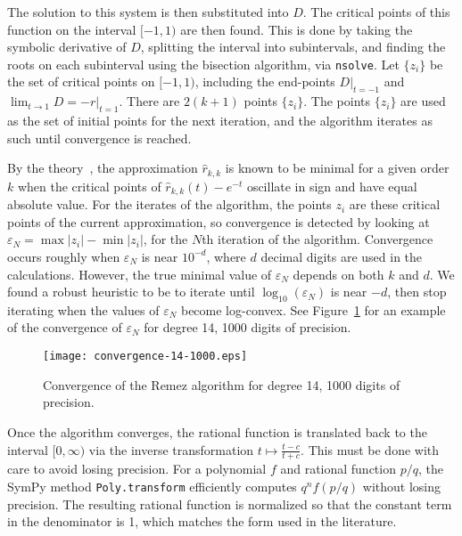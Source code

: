 The solution to this system is then substituted into $D$. The critical points
of this function on the interval $[-1, 1)$ are then found. This is done by
taking the symbolic derivative of $D$, splitting the interval into
subintervals, and finding the roots on each subinterval using the bisection
algorithm, via \texttt{nsolve}. Let $\{z_i\}$ be the set of critical points on
$[-1, 1)$, including the end-points $D|_{t=-1}$ and
$\lim_{t\to 1} D=-r|_{t=1}$. There are $2(k+1)$ points $\{z_i\}$. The points
$\{z_i\}$ are used as the set of initial points for the next iteration, and
the algorithm iterates as such until convergence is reached.

By the theory~\cite{ationneeded}, the approximation $\hat{r}_{k, k}$ is known
to be minimal for a given order $k$ when the critical points of
$\hat{r}_{k, k}(t) - e^{-t}$ oscillate in sign and have equal absolute value.
For the iterates of the algorithm, the points $z_i$ are these critical points
of the current approximation, so convergence is detected by looking at
$\varepsilon_N = \max{|z_i|} - \min{|z_i|}$, for the $N$th iteration of the
algorithm. Convergence occurs roughly when $\varepsilon_N$ is near $10^{-d}$,
where $d$ decimal digits are used in the calculations. However, the true
minimal value of $\varepsilon_N$ depends on both $k$ and $d$. We found a
robust heuristic to be to iterate until $\log_{10}{(\varepsilon_N)}$ is near
$-d$, then stop iterating when the values of $\varepsilon_N$ become
log-convex. See Figure~\ref{fig:convergence-14-1000} for an example of the
convergence of $\varepsilon_N$ for degree 14, 1000 digits of precision.

\begin{figure}[!ht]
\centering
\texttt{[image: convergence-14-1000.eps]}
\caption{Convergence of the Remez algorithm for degree 14, 1000 digits of
  precision.}
\label{fig:convergence-14-1000}
\end{figure}

Once the algorithm converges, the rational function is translated back to the
interval $[0, \infty)$ via the inverse transformation $t\mapsto \frac{t - c}{t
  + c}$. This must be done with care to avoid losing precision. For a
polynomial $f$ and rational function $p/q$, the SymPy
method \texttt{Poly.transform} efficiently computes
$q^nf\left(p/q\right)$ without losing precision. The resulting
rational function is normalized so that the constant term in the denominator
is 1, which matches the form used in the literature.~\cite{ationneeded}

